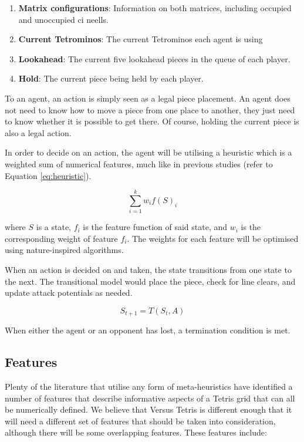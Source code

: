 \documentclass[a4paper, 12pt]{extreport}
\begin{document}
				\begin{enumerate}
					\item \textbf{Matrix configurations}: Information on both matrices, including occupied and unoccupied ci neells.
					\item \textbf{Current Tetrominos}: The current Tetrominos each agent is using
					\item \textbf{Lookahead}: The current five lookahead pieces in the queue of each player.
					\item \textbf{Hold}: The current piece being held by each player.
				\end{enumerate}
				
				To an agent, an action is simply seen as a legal piece placement. An agent does not need to know how to move a piece from one place to another, they just need to know whether it is possible to get there. Of course, holding the current piece is also a legal action.
				
				In order to decide on an action, the agent will be utilising a heuristic which is a weighted sum of numerical features, much like in previous studies (refer to Equation \ref{eq:heuristic}).
				
				\begin{equation} 
					\sum_{i=1}^{k} w_i f(S)_i
				\end{equation}\label{eq:heuristic}
				
				\noindent where $S$ is a state, $f_i$ is the feature function of said state, and $w_i$ is the corresponding weight of feature $f_i$. The weights for each feature will be optimised using nature-inspired algorithms.
				
				When an action is decided on and taken, the state transitions from one state to the next. The transitional model would place the piece, check for line clears, and update attack potentials as needed.
				
				\begin{equation}
					S_{t+1} = T(S_t, A)
				\end{equation}
				
				When either the agent or an opponent has lost, a termination condition is met.
				
			\subsection{Features}\label{subsec:features}
				
				Plenty of the literature that utilise any form of meta-heuristics have identified a number of features that describe informative aspects of a Tetris grid that can all be numerically defined. We believe that Versus Tetris is different enough that it will need a different set of features that should be taken into consideration, although there will be some overlapping features. These features include:
				
\end{document}
